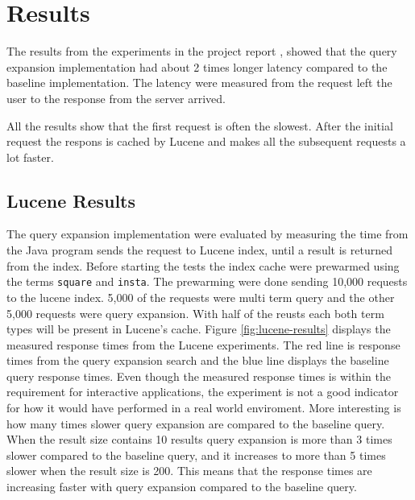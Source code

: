 \section{Results}
\label{sec:results}
The results from the experiments in the project report \cite{project-report},
showed that the query expansion implementation had about 2 times longer latency compared to the baseline implementation.
The latency were measured from the request left the user to the response from the server arrived.

All the results show that the first request is often the slowest.
After the initial request the respons is cached by Lucene and makes all the subsequent requests a lot faster.

\subsection{Lucene Results}
The query expansion implementation were evaluated by measuring the time from the Java program sends the request to Lucene index,
until a result is returned from the index.
Before starting the tests the index cache were prewarmed using the terms \texttt{square} and \texttt{insta}.
The prewarming were done sending 10,000 requests to the lucene index.
5,000 of the requests were multi term query and the other 5,000 requests were query expansion.
With half of the reusts each both term types will be present in Lucene's cache.
Figure \ref{fig:lucene-results} displays the measured response times from the Lucene experiments.
The red line is response times from the query expansion search and the blue line displays the baseline query response times.
Even though the measured response times is within the requirement for interactive applications,
the experiment is not a good indicator for how it would have performed in a real world enviroment.
More interesting is how many times slower query expansion are compared to the baseline query.
When the result size contains 10 results query expansion is more than 3 times slower compared to the baseline query,
and it increases to more than 5 times slower when the result size is 200.
This means that the response times are increasing faster with query expansion compared to the baseline query.

